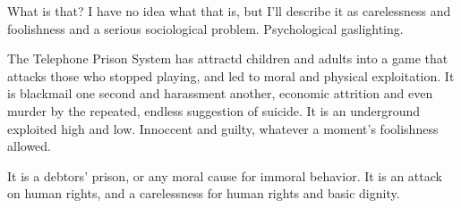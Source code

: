 

What is that?  I have no idea what that is, but I'll describe it as
carelessness and foolishness and a serious sociological problem.
Psychological gaslighting.

The Telephone Prison System has attractd children and adults into a
game that attacks those who stopped playing, and led to moral and
physical exploitation.  It is blackmail one second and harassment
another, economic attrition and even murder by the repeated, endless
suggestion of suicide.  It is an underground exploited high and low.
Innoccent and guilty, whatever a moment's foolishness allowed.

It is a debtors' prison, or any moral cause for immoral behavior.  It
is an attack on human rights, and a carelessness for human rights and
basic dignity.

\bye
